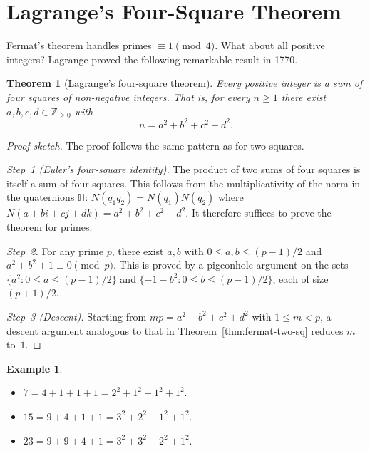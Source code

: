 \documentclass[12pt,a4paper,openany]{book}
\theoremstyle{definition}
\newtheorem{example}[definition]{Example}
\theoremstyle{plain}
\newtheorem{theorem}[definition]{Theorem}
\theoremstyle{remark}
\newcommand{\Z}{\mathbb{Z}}
\begin{document}
\section{Lagrange's Four-Square Theorem}\label{sec:four-sq}

Fermat's theorem handles primes $\equiv 1\pmod{4}$.  What about all positive
integers?  Lagrange proved the following remarkable result in 1770.

\begin{theorem}[Lagrange's four-square theorem]\label{thm:lagrange-four-sq}
Every positive integer is a sum of four squares of non-negative integers.
That is, for every $n \ge 1$ there exist $a,b,c,d \in \Z_{\ge 0}$ with
\[
  n = a^2 + b^2 + c^2 + d^2.
\]
\end{theorem}

\begin{proof}[Proof sketch]
The proof follows the same pattern as for two squares.

\textit{Step~1 (Euler's four-square identity).}
The product of two sums of four squares is itself a sum of four squares.
This follows from the multiplicativity of the norm in the quaternions
$\mathbb{H}$: $N(q_1 q_2) = N(q_1)N(q_2)$ where
$N(a + bi + cj + dk) = a^2+b^2+c^2+d^2$.  It therefore suffices to prove the
theorem for primes.

\textit{Step~2.}
For any prime $p$, there exist $a,b$ with $0 \le a,b \le (p-1)/2$
and $a^2 + b^2 + 1 \equiv 0 \pmod{p}$.  This is proved by a pigeonhole
argument on the sets $\{a^2 : 0 \le a \le (p-1)/2\}$ and
$\{-1-b^2 : 0 \le b \le (p-1)/2\}$, each of size $(p+1)/2$.

\textit{Step~3 (Descent).}
Starting from $mp = a^2+b^2+c^2+d^2$ with $1 \le m < p$, a descent
argument analogous to that in Theorem~\ref{thm:fermat-two-sq} reduces $m$
to~$1$.
\end{proof}

\begin{example}\label{ex:four-sq}
\leavevmode
\begin{itemize}
  \item $7 = 4 + 1 + 1 + 1 = 2^2 + 1^2 + 1^2 + 1^2$.
  \item $15 = 9 + 4 + 1 + 1 = 3^2 + 2^2 + 1^2 + 1^2$.
  \item $23 = 9 + 9 + 4 + 1 = 3^2 + 3^2 + 2^2 + 1^2$.
\end{itemize}
\end{example}
\end{document}
